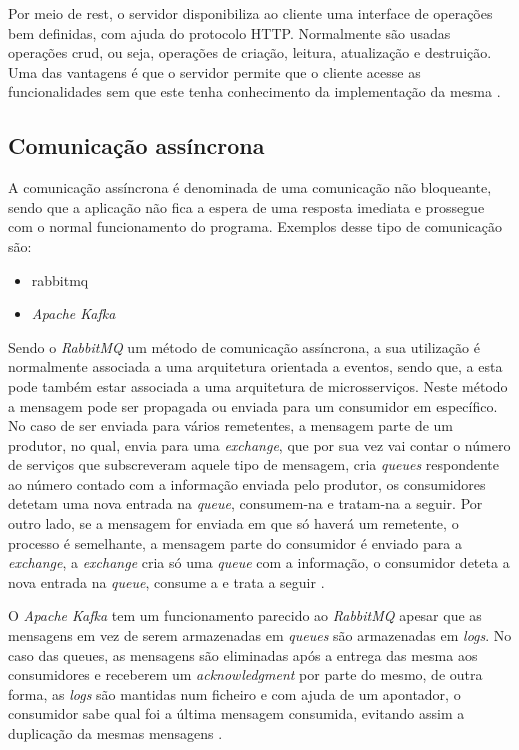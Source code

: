Por meio de \ac{rest}, o servidor disponibiliza ao cliente uma interface de operações bem definidas, com ajuda do protocolo HTTP. Normalmente são usadas operações \ac{crud}, ou seja, operações de criação, leitura, atualização e destruição. Uma das vantagens é que o servidor permite que o cliente acesse as funcionalidades sem que este tenha conhecimento da implementação da mesma \cite{SOAPREST}.


\subsection{Comunicação assíncrona}

A comunicação assíncrona é denominada de uma comunicação não bloqueante, sendo que a aplicação não fica a espera de uma resposta imediata e prossegue com o normal funcionamento do programa.
Exemplos desse tipo de comunicação são: 
\begin{itemize}
    \item \ac{rabbitmq}
    \item \textit{Apache Kafka}
\end{itemize}

Sendo o \textit{RabbitMQ} um método de comunicação assíncrona, a sua utilização é normalmente associada a uma arquitetura orientada a eventos, sendo que, a esta pode também estar associada a uma arquitetura de microsserviços. Neste método a mensagem pode ser propagada ou enviada para um consumidor em específico. No caso de ser enviada para vários remetentes, a mensagem parte de um produtor, no qual, envia para uma \textit{exchange}, que por sua vez vai contar o número de serviços que subscreveram aquele tipo de mensagem, cria \textit{queues} respondente ao número contado com a informação enviada pelo produtor, os consumidores detetam uma nova entrada na \textit{queue}, consumem-na e tratam-na a seguir. Por outro lado, se a mensagem for enviada em que só haverá um remetente, o processo é semelhante, a mensagem parte do consumidor é enviado para a \textit{exchange}, a \textit{exchange} cria só uma \textit{queue} com a informação, o consumidor deteta a nova entrada na \textit{queue}, consume a e trata a seguir \cite{rabbit}.

O \textit{Apache Kafka} tem um funcionamento parecido ao \textit{RabbitMQ} apesar que as mensagens em vez de serem armazenadas em \textit{queues} são armazenadas em \textit{logs}. No caso das queues, as mensagens são eliminadas após a entrega das mesma aos consumidores e receberem um \textit{acknowledgment} por parte do mesmo, de outra forma, as \textit{logs} são mantidas num ficheiro e com ajuda de um apontador, o consumidor sabe qual foi a última mensagem consumida, evitando assim a duplicação da mesmas mensagens \cite{kafka}.

